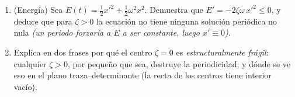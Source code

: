 \begin{problem}
\begin{enumerate}[resume]
        $\zeta \geq 1$: el amortiguamiento crítico $\zeta = 1$ da el
        regreso al reposo más rápido sin oscilación.
  \item (Energía) Sea $E(t) = \frac12x'^2 + \frac12\omega^2x^2$.
        Demuestra que $E' = -2\zeta\omega\,x'^2 \leq 0$, y deduce
        que para $\zeta > 0$ la ecuación no tiene ninguna solución
        periódica no nula \emph{(un periodo forzaría a $E$ a ser
        constante, luego $x' \equiv 0$)}.
  \item Explica en dos frases por qué el centro $\zeta = 0$ es
        \emph{estructuralmente frágil}: cualquier $\zeta > 0$, por
        pequeño que sea, destruye la periodicidad; y dónde se ve eso
        en el plano traza--determinante (la recta de los centros
        tiene interior vacío).
\end{enumerate}


\end{problem}
